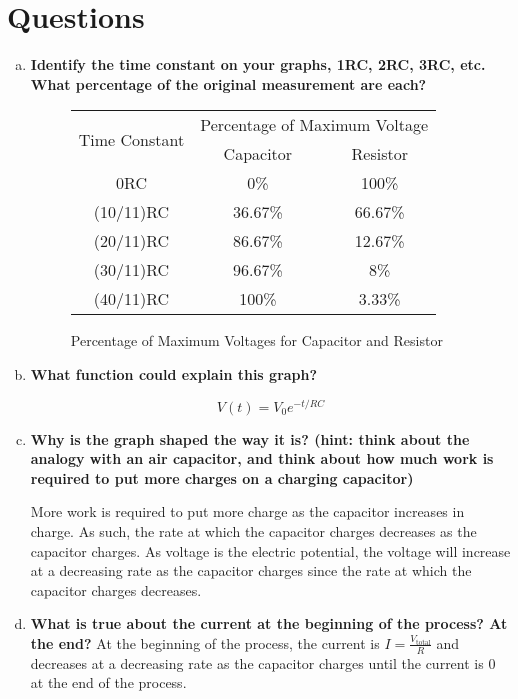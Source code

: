 \documentclass[article, 12pt]{article}
\begin{document}
    \section{Questions}
    \begin{enumerate}[a)]
        \item \textbf{Identify the time constant on your graphs, 1RC, 2RC, 3RC, etc.  What percentage of the original measurement are each?}
        
        \begin{figure}[H]
            \centering
            \begin{tabular}{|c|c|c|}
                \hline
                \multirow{2}{*}{Time Constant} & \multicolumn{2}{c|}{Percentage of Maximum Voltage} \\
                \cline{2-3}
                & Capacitor & Resistor \\
                \hline
                0RC & 0\% & 100\% \\
                (10/11)RC & 36.67\% & 66.67\% \\
                (20/11)RC & 86.67\% & 12.67\% \\
                (30/11)RC & 96.67\% & 8\% \\
                (40/11)RC & 100\% & 3.33\% \\
                \hline
            \end{tabular}
            \caption{Percentage of Maximum Voltages for Capacitor and Resistor}
        \end{figure}
        \item \textbf{What function could explain this graph?}
        
        \begin{equation}
            V(t) = V_0e^{-t/{RC}}
        \end{equation}
        \item \textbf{Why is the graph shaped the way it is? (hint: think about the analogy with an air capacitor, and think about how much work is required to put more charges on a charging capacitor)}
        
        More work is required to put more charge as the capacitor increases in charge. As such, the rate at which the capacitor charges decreases as the capacitor charges. As voltage is the electric potential, the voltage will increase at a decreasing rate as the capacitor charges since the rate at which the capacitor charges decreases.
        \item \textbf{What is true about the current at the beginning of the process? At the end?}
        At the beginning of the process, the current is $I = \displaystyle{\frac{V_{\text{total}}}{R}}$ and decreases at a decreasing rate as the capacitor charges until the current is 0 at the end of the process.
    \end{enumerate}
\end{document}
